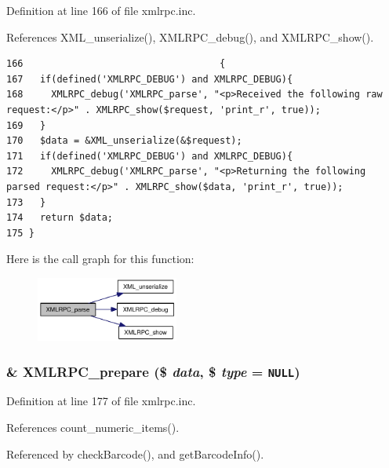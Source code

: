 Definition at line 166 of file xmlrpc.inc.

References XML\_\-unserialize(), XMLRPC\_\-debug(), and XMLRPC\_\-show().

\begin{Code}\begin{verbatim}166                                   {
167   if(defined('XMLRPC_DEBUG') and XMLRPC_DEBUG){
168     XMLRPC_debug('XMLRPC_parse', "<p>Received the following raw request:</p>" . XMLRPC_show($request, 'print_r', true));
169   }
170   $data = &XML_unserialize(&$request);
171   if(defined('XMLRPC_DEBUG') and XMLRPC_DEBUG){
172     XMLRPC_debug('XMLRPC_parse', "<p>Returning the following parsed request:</p>" . XMLRPC_show($data, 'print_r', true));
173   }
174   return $data;
175 }
\end{verbatim}
\end{Code}




Here is the call graph for this function:\nopagebreak
\begin{figure}[H]
\begin{center}
\leavevmode
\includegraphics[width=133pt]{xmlrpc_8inc_708b2136ca600664d2207a511b3cf3f8_cgraph}
\end{center}
\end{figure}
\hypertarget{xmlrpc_8inc_c13be54b26e0803d8745e4f019dcfd8a}{
\subsubsection{\setlength{\rightskip}{0pt plus 5cm}\& XMLRPC\_\-prepare (\$ {\em data}, \$ {\em type} = {\tt NULL})}}
\label{xmlrpc_8inc_c13be54b26e0803d8745e4f019dcfd8a}




Definition at line 177 of file xmlrpc.inc.

References count\_\-numeric\_\-items().

Referenced by checkBarcode(), and getBarcodeInfo().

